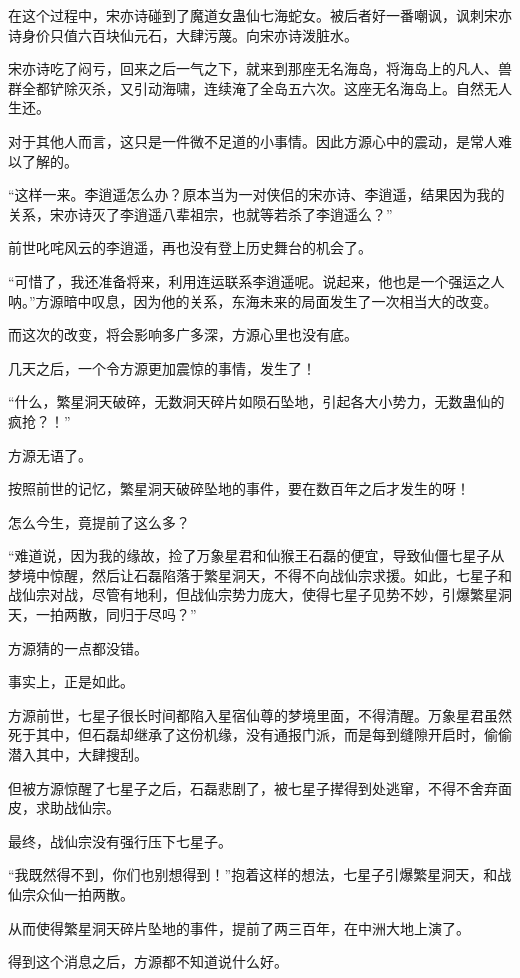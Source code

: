 \begin{this_body}
在这个过程中，宋亦诗碰到了魔道女蛊仙七海蛇女。被后者好一番嘲讽，讽刺宋亦诗身价只值六百块仙元石，大肆污蔑。向宋亦诗泼脏水。

宋亦诗吃了闷亏，回来之后一气之下，就来到那座无名海岛，将海岛上的凡人、兽群全都铲除灭杀，又引动海啸，连续淹了全岛五六次。这座无名海岛上。自然无人生还。

对于其他人而言，这只是一件微不足道的小事情。因此方源心中的震动，是常人难以了解的。

“这样一来。李逍遥怎么办？原本当为一对侠侣的宋亦诗、李逍遥，结果因为我的关系，宋亦诗灭了李逍遥八辈祖宗，也就等若杀了李逍遥么？”

前世叱咤风云的李逍遥，再也没有登上历史舞台的机会了。

“可惜了，我还准备将来，利用连运联系李逍遥呢。说起来，他也是一个强运之人呐。”方源暗中叹息，因为他的关系，东海未来的局面发生了一次相当大的改变。

而这次的改变，将会影响多广多深，方源心里也没有底。

几天之后，一个令方源更加震惊的事情，发生了！

“什么，繁星洞天破碎，无数洞天碎片如陨石坠地，引起各大小势力，无数蛊仙的疯抢？！”

方源无语了。

按照前世的记忆，繁星洞天破碎坠地的事件，要在数百年之后才发生的呀！

怎么今生，竟提前了这么多？

“难道说，因为我的缘故，捡了万象星君和仙猴王石磊的便宜，导致仙僵七星子从梦境中惊醒，然后让石磊陷落于繁星洞天，不得不向战仙宗求援。如此，七星子和战仙宗对战，尽管有地利，但战仙宗势力庞大，使得七星子见势不妙，引爆繁星洞天，一拍两散，同归于尽吗？”

方源猜的一点都没错。

事实上，正是如此。

方源前世，七星子很长时间都陷入星宿仙尊的梦境里面，不得清醒。万象星君虽然死于其中，但石磊却继承了这份机缘，没有通报门派，而是每到缝隙开启时，偷偷潜入其中，大肆搜刮。

但被方源惊醒了七星子之后，石磊悲剧了，被七星子撵得到处逃窜，不得不舍弃面皮，求助战仙宗。

最终，战仙宗没有强行压下七星子。

“我既然得不到，你们也别想得到！”抱着这样的想法，七星子引爆繁星洞天，和战仙宗众仙一拍两散。

从而使得繁星洞天碎片坠地的事件，提前了两三百年，在中洲大地上演了。

得到这个消息之后，方源都不知道说什么好。


\end{this_body}
